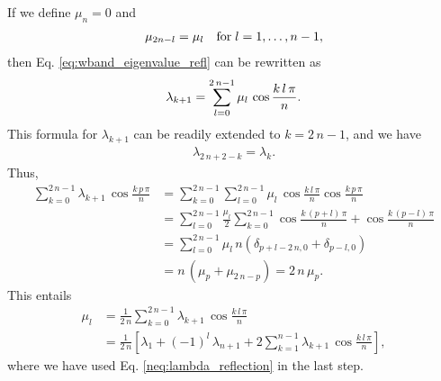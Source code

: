 \documentclass[preprint, floatfix]{revtex4-1}
\begin{document}
{  %
  If we define $\mu_n = 0$ and
  \begin{align}
    \mu_{ 2 n - l } = \mu_l
    \quad
    \mathrm{for\;} l = 1, \dots, n - 1,
  \notag
  \end{align}
  then Eq. \eqref{eq:wband_eigenvalue_refl} can be rewritten as
  \begin{align}
    \lambda_{k+1}
    =
    \sum_{ l = 0 }^{ 2 \, n - 1 }
    \mu_l \, \cos \frac{ k \, l \, \pi } { n }.
  \notag
  \end{align}
  This formula for $\lambda_{k+1}$
  can be readily extended to $k = 2 \, n - 1$,
  and we have
  \begin{align}
    \lambda_{ 2 \, n + 2 - k } = \lambda_k.
    \tag{N3}
    \label{neq:lambda_reflection}
  \end{align}
  Thus,
  $$
  \begin{aligned}
    \sum_{ k = 0 }^{ 2 \, n - 1 }
      \lambda_{ k + 1 } \,
      \cos \frac{ k \, p \, \pi }
                {      n        }
    &=
    \sum_{ k = 0 }^{ 2 \, n - 1 }
      \sum_{ l = 0 }^{ 2 \, n - 1 }
        \mu_l \,
        \cos \frac{ k \, l \, \pi }
                  {      n        }
        \cos \frac{ k \, p \, \pi }
                  {      n        }
    \\
    &=
    \sum_{ l = 0 }^{ 2 \, n - 1 }
      \frac{ \mu_l } { 2 }
      \sum_{ k = 0 }^{ 2 \, n - 1 }
        \cos \frac{ k \, (p + l) \, \pi }
                  {      n        }
                  +
        \cos \frac{ k \, (p - l) \, \pi }
                  {      n        }
    \\
    &=
    \sum_{ l = 0 }^{ 2 \, n - 1 }
      \mu_l \, n \left(
        \delta_{ p + l - 2 \, n, 0 }
        +
        \delta_{ p - l, 0 }
      \right)
    \\
    &=
    n \, \left( \mu_p + \mu_{ 2 \, n - p} \right)
    =
    2 \, n \, \mu_p.
  \end{aligned}
  $$
  This entails
  $$
  \begin{aligned}
    \mu_l
    &=
    \frac{    1   }
         { 2 \, n }
    \sum_{ k = 0 }^{ 2 \, n - 1 }
      \lambda_{ k + 1 } \,
      \cos \frac{ k \, l \, \pi }
                {      n        }
              \\
    &=
    \frac{    1   }
         { 2 \, n }
    \left[
      \lambda_1
      +
      (-1)^l \, \lambda_{n + 1}
      +
      2 \sum_{ k = 1 }^{ n - 1 }
        \lambda_{ k + 1 } \,
        \cos \frac{ k \, l \, \pi }
                  {      n        }
    \right],
  \end{aligned}
  $$
  where we have used Eq. \eqref{neq:lambda_reflection}
  in the last step.

}
\end{document}
